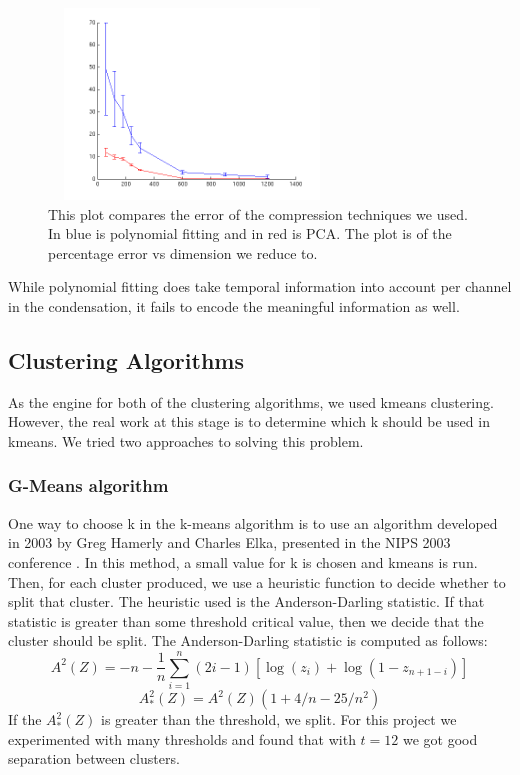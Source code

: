 \documentclass[conference]{IEEEtran}
\begin{document}
\begin{figure}
\centering
\includegraphics[width=3in,height=2in]{../poster/images/error_poly_pca.png}
\caption{This plot compares the error of the compression techniques we
  used. In blue is polynomial fitting and in red is PCA. The plot is of
  the percentage error vs dimension we reduce to.}
\end{figure}

While polynomial fitting does take temporal information into
account per channel in the condensation, it fails to encode the
meaningful information as well.

\subsection{Clustering Algorithms}
As the engine for both of the clustering algorithms, we used kmeans
clustering. However, the real work at this stage is to determine which k
should be used in kmeans. We tried two approaches to solving this
problem. 

\subsubsection{G-Means algorithm}
One way to choose k in the k-means algorithm is to use an algorithm
developed in 2003 by Greg Hamerly and Charles Elka, presented in the NIPS
2003 conference \cite{gmeans}. In this method, a small value for k is
chosen and kmeans is run. Then, for each cluster produced, we use a
heuristic function to decide whether to split that cluster. The heuristic
used is the Anderson-Darling statistic. If that statistic is greater than
some threshold critical value, then we decide that the cluster should be
split. The Anderson-Darling statistic is computed as follows:
$$
A^2(Z) = -n - \frac{1}{n}\sum_{i=1}^n (2i -
1)[\log(z_i)+\log(1-z_{n+1-i})]
$$$$
A^2_*(Z) = A^2(Z)(1 + 4/n - 25/n^2)
$$
If the $A^2_*(Z)$ is greater than the threshold, we split. For this
project we experimented with many thresholds and found that with $t=12$ we
got good separation between clusters.
\end{document}
